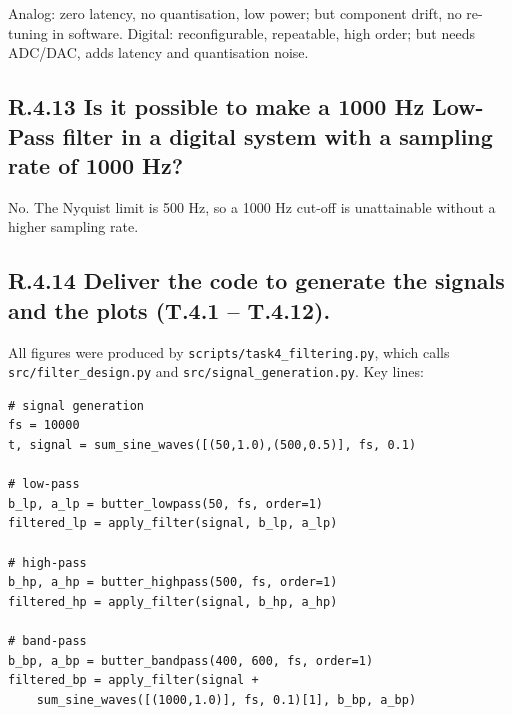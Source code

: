 \documentclass{article}
\begin{document}
Analog: zero latency, no quantisation, low power; but component drift, no re-tuning in software.  
Digital: reconfigurable, repeatable, high order; but needs ADC/DAC, adds latency and quantisation noise.

\subsection*{R.4.13 Is it possible to make a 1000 Hz Low-Pass filter in a digital system with a sampling rate of 1000 Hz?}

No.  The Nyquist limit is 500 Hz, so a 1000 Hz cut-off is unattainable without a higher sampling rate.

\subsection*{R.4.14 Deliver the code to generate the signals and the plots (T.4.1 – T.4.12).}

All figures were produced by \texttt{scripts/task4\_filtering.py}, which calls
\texttt{src/filter\_design.py} and \texttt{src/signal\_generation.py}.  
Key lines:

\begin{verbatim}
# signal generation
fs = 10000
t, signal = sum_sine_waves([(50,1.0),(500,0.5)], fs, 0.1)

# low-pass
b_lp, a_lp = butter_lowpass(50, fs, order=1)
filtered_lp = apply_filter(signal, b_lp, a_lp)

# high-pass
b_hp, a_hp = butter_highpass(500, fs, order=1)
filtered_hp = apply_filter(signal, b_hp, a_hp)

# band-pass
b_bp, a_bp = butter_bandpass(400, 600, fs, order=1)
filtered_bp = apply_filter(signal + 
    sum_sine_waves([(1000,1.0)], fs, 0.1)[1], b_bp, a_bp)
\end{verbatim}



\end{document}
